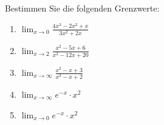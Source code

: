\begin{ExerciseBlock}
Bestimmen Sie die folgenden Grenzwerte:
\begin{enumerate}[label=\alph*)]
\item
$ \displaystyle \lim_{x\rightarrow 0} \frac{4x^3-2x^2+x}{3x^2+2x}$
\item
$ \displaystyle\lim_{x\rightarrow 2}\frac{x^2-5x+6}{x^2-12x+20}$

\item
$ \displaystyle\lim_{x\rightarrow \infty}\frac{x^2-x+3}{x^3-x+2}$

\item $ \displaystyle \lim_{x\rightarrow \infty} e^{-x} \cdot x^2$

\item $ \displaystyle \lim_{x\rightarrow 0} e^{-x} \cdot x^2$
\end{enumerate}

\end{ExerciseBlock}
